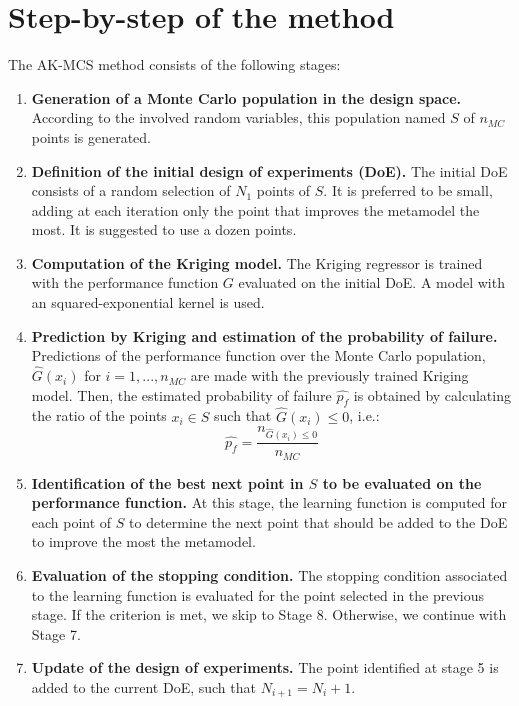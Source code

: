 \section{Step-by-step of the method}
The AK-MCS method consists of the following stages:

\begin{enumerate}
    \item \textbf{Generation of a Monte Carlo population in the design space.}
    According to the involved random variables, this population named $S$ of $n_{MC}$ points 
    is generated.
    \item \textbf{Definition of the initial design of experiments (DoE).} The initial
    DoE consists of a random selection of $N_1$ points of $S$. It is preferred to be
    small, adding at each iteration only the point that improves the metamodel
    the most. It is suggested to use a dozen points.
    \item \textbf{Computation of the Kriging model.} The Kriging regressor is trained
    with the performance function $G$ evaluated on the initial DoE. A model with an
    squared-exponential kernel is used.
    \item \textbf{Prediction by Kriging and estimation of the probability of failure.}
    Predictions of the performance function over the Monte Carlo population, $\widehat{G}(x_i)$
    for $i = 1, ..., n_{MC}$ are made with the previously trained Kriging model. 
    Then, the estimated probability of failure $\widehat{p_f}$ is obtained by calculating the ratio
    of the points $x_i \in S$ such that $\widehat{G}(x_i) \leq 0$, i.e.:
    \begin{equation}
        \widehat{p_f} = \frac{n_{\widehat{G}(x_i) \leq 0}}{n_{MC}}
    \end{equation}
    \item \textbf{Identification of the best next point in $S$ to be evaluated on the
    performance function.} At this stage, the learning function is computed for each
    point of $S$ to determine the next point that should be added to the DoE to
    improve the most the metamodel.
    \item \textbf{Evaluation of the stopping condition.} The stopping condition
    associated to the learning function is evaluated for the point selected in the
    previous stage. If the criterion is met, we skip to Stage 8. Otherwise, we
    continue with Stage 7.
    \item \textbf{Update of the design of experiments.}
    The point identified at stage 5 is added to the current DoE, such that $N_{i+1} = N_i + 1$.

\end{enumerate}

